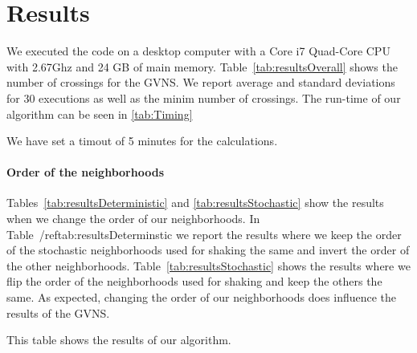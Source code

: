 \documentclass{scrartcl}
\begin{document}
\section{Results}

We executed the code on a desktop computer with a Core i7 Quad-Core
CPU with 2.67Ghz and 24 GB of main
memory. Table~\ref{tab:resultsOverall} shows the number of crossings
for the GVNS. We report average and standard deviations for $30$
executions as well as the minim number of crossings. The run-time of
our algorithm can be seen in \ref{tab:Timing}

We have set a timout of 5 minutes for the calculations.








\paragraph{Order of the neighborhoods}
Tables~\ref{tab:resultsDeterministic} and \ref{tab:resultsStochastic}
show the results when we change the order of our neighborhoods. In
Table~/ref{tab:resultsDeterminstic} we report the results where we
keep the order of the stochastic neighborhoods used for shaking the
same and invert the order of the other
neighborhoods. Table~\ref{tab:resultsStochastic} shows the results
where we flip the order of the neighborhoods used for shaking and keep
the others the same. As expected, changing the order of our
neighborhoods does influence the results of the GVNS.










\begin{table}[H]
  \centering
  \scriptsize
  
\caption{This table shows the results of our algorithm.}
\label{tab:resultsOverall}
\end{table}
\end{document}
